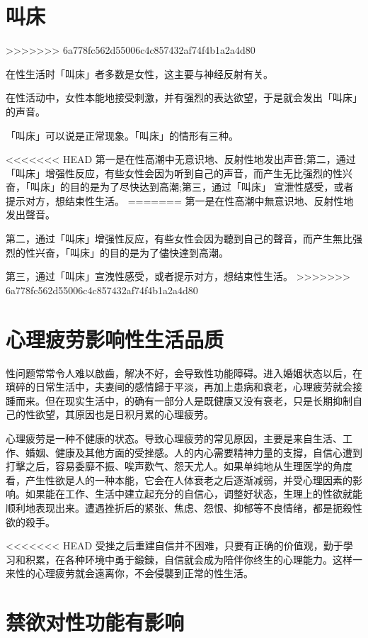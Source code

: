 \documentclass[12pt,UTF8]{ctexbook}
\begin{document}
\section{叫床}
>>>>>>> 6a778fc562d55006c4c857432af74f4b1a2a4d80

在性生活时「叫床」者多数是女性，这主要与神经反射有关。

在性活动中，女性本能地接受刺激，并有强烈的表达欲望，于是就会发出「叫床」的声音。

「叫床」可以说是正常现象。「叫床」的情形有三种。

<<<<<<< HEAD
第一是在性高潮中无意识地、反射性地发出声音;第二，通过「叫床」增强性反应，有些女性会因为听到自己的声音，而产生无比强烈的性兴奋，「叫床」的目的是为了尽快达到高潮;第三，通过「叫床」
宣泄性感受，或者提示对方，想结束性生活。
=======
第一是在性高潮中無意识地、反射性地发出聲音。

第二，通过「叫床」增强性反应，有些女性会因为聽到自己的聲音，而产生無比强烈的性兴奋，「叫床」的目的是为了儘快達到高潮。

第三，通过「叫床」宣洩性感受，或者提示对方，想结束性生活。
>>>>>>> 6a778fc562d55006c4c857432af74f4b1a2a4d80

\section{心理疲劳影响性生活品质}

性问题常常令人难以啟齒，解决不好，会导致性功能障碍。进入婚姻状态以后，在瑣碎的日常生活中，夫妻间的感情歸于平淡，再加上患病和衰老，心理疲劳就会接踵而来。但在现实生活中，的确有一部分人是既健康又没有衰老，只是长期抑制自己的性欲望，其原因也是日积月累的心理疲劳。

心理疲劳是一种不健康的状态。导致心理疲劳的常见原因，主要是来自生活、工作、婚姻、健康及其他方面的受挫感。人的内心需要精神力量的支撐，自信心遭到打擊之后，容易委靡不振、唉声歎气、怨天尤人。如果单纯地从生理医学的角度看，产生性欲是人的一种本能，它会在人体衰老之后逐渐减弱，并受心理因素的影响。如果能在工作、生活中建立起充分的自信心，调整好状态，生理上的性欲就能顺利地表现出来。遭遇挫折后的紧张、焦虑、怨恨、抑郁等不良情绪，都是扼殺性欲的殺手。

<<<<<<< HEAD
受挫之后重建自信并不困难，只要有正确的价值观，勤于學习和积累，在各种环境中勇于鍛鍊，自信就会成为陪伴你终生的心理能力。这样一来性的心理疲劳就会遠离你，不会侵襲到正常的性生活。

\section{禁欲对性功能有影响}
\end{document}
